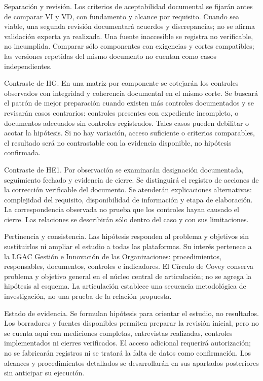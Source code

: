 {Separación y revisión. Los criterios de aceptabilidad documental se fijarán antes de comparar VI y VD, con fundamento y alcance por requisito. Cuando sea viable, una segunda revisión documentará acuerdos y discrepancias; no se afirma validación experta ya realizada. Una fuente inaccesible se registra no verificable, no incumplida. Comparar sólo componentes con exigencias y cortes compatibles; las versiones repetidas del mismo documento no cuentan como casos independientes.


Contraste de HG. En una matriz por componente se cotejarán los controles observados con integridad y coherencia documental en el mismo corte. Se buscará el patrón de mejor preparación cuando existen más controles documentados y se revisarán casos contrarios: controles presentes con expediente incompleto, o documentos adecuados sin controles registrados. Tales casos pueden debilitar o acotar la hipótesis. Si no hay variación, acceso suficiente o criterios comparables, el resultado será no contrastable con la evidencia disponible, no hipótesis confirmada.


Contraste de HE1. Por observación se examinarán designación documentada, seguimiento fechado y evidencia de cierre. Se distinguirá el registro de acciones de la corrección verificable del documento. Se atenderán explicaciones alternativas: complejidad del requisito, disponibilidad de información y etapa de elaboración. La correspondencia observada no prueba que los controles hayan causado el cierre. Las relaciones se describirán sólo dentro del caso y con sus limitaciones.


Pertinencia y consistencia. Las hipótesis responden al problema y objetivos sin sustituirlos ni ampliar el estudio a todas las plataformas. Su interés pertenece a la LGAC Gestión e Innovación de las Organizaciones: procedimientos, responsables, documentos, controles e indicadores. El Círculo de Covey conserva problema y objetivo general en el núcleo central de articulación; no se agrega la hipótesis al esquema. La articulación establece una secuencia metodológica de investigación, no una prueba de la relación propuesta.


Estado de evidencia. Se formulan hipótesis para orientar el estudio, no resultados. Los borradores y fuentes disponibles permiten preparar la revisión inicial, pero no se cuenta aquí con mediciones completas, entrevistas realizadas, controles implementados ni cierres verificados. El acceso adicional requerirá autorización; no se fabricarán registros ni se tratará la falta de datos como confirmación. Los alcances y procedimientos detallados se desarrollarán en sus apartados posteriores sin anticipar su ejecución.


}
